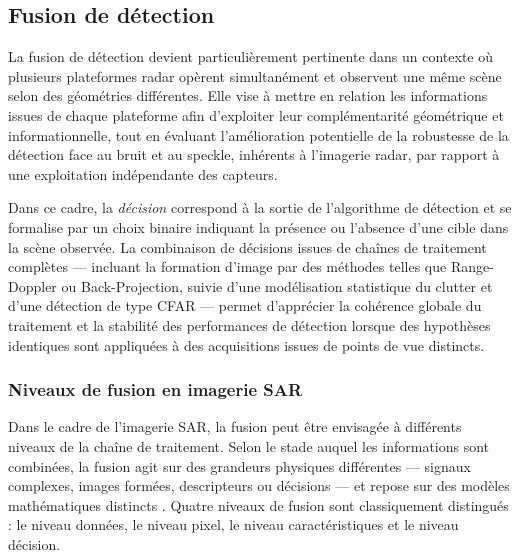 \subsection{Fusion de détection}

La fusion de détection devient particulièrement pertinente dans un contexte où plusieurs plateformes radar opèrent simultanément et observent une même scène selon des géométries différentes.  
Elle vise à mettre en relation les informations issues de chaque plateforme afin d’exploiter leur complémentarité géométrique et informationnelle, tout en évaluant l’amélioration potentielle de la robustesse de la détection face au bruit et au speckle, inhérents à l’imagerie radar, par rapport à une exploitation indépendante des capteurs.

Dans ce cadre, la \emph{décision} correspond à la sortie de l’algorithme de détection et se formalise par un choix binaire indiquant la présence ou l’absence d’une cible dans la scène observée.  
La combinaison de décisions issues de chaînes de traitement complètes — incluant la formation d’image par des méthodes telles que Range-Doppler ou Back-Projection, suivie d’une modélisation statistique du clutter et d’une détection de type CFAR — permet d’apprécier la cohérence globale du traitement et la stabilité des performances de détection lorsque des hypothèses identiques sont appliquées à des acquisitions issues de points de vue distincts.


\subsubsection{Niveaux de fusion en imagerie SAR}

Dans le cadre de l’imagerie SAR, la fusion peut être envisagée à différents niveaux de la chaîne de traitement.  
Selon le stade auquel les informations sont combinées, la fusion agit sur des grandeurs physiques différentes — signaux complexes, images formées, descripteurs ou décisions — et repose sur des modèles mathématiques distincts \cite{hall1997,llinas2004,varshney1997}.  
Quatre niveaux de fusion sont classiquement distingués : le niveau données, le niveau pixel, le niveau caractéristiques et le niveau décision.


